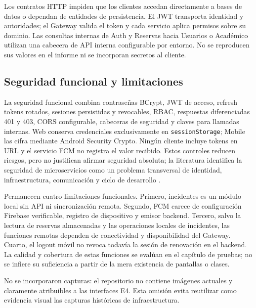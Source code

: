 Los contratos HTTP impiden que los clientes accedan directamente a bases de
datos o dependan de entidades de persistencia. El JWT transporta identidad y
autoridades; el Gateway valida el token y cada servicio aplica permisos sobre
su dominio. Las consultas internas de Auth y Reservas hacia Usuarios o
Académico utilizan una cabecera de API interna configurable por entorno. No se
reproducen sus valores en el informe ni se incorporan secretos al cliente.

\subsection{Seguridad funcional y limitaciones}
\label{subsec:seguridad-limitaciones-apps}

La seguridad funcional combina contraseñas BCrypt, JWT de acceso, refresh tokens
rotados, sesiones persistidas y revocables, RBAC, respuestas diferenciadas 401 y
403, CORS configurable, cabeceras de seguridad y claves para llamadas internas.
Web conserva credenciales exclusivamente en \texttt{sessionStorage}; Mobile las
cifra mediante Android Security Crypto. Ningún cliente incluye tokens en URL y
el servicio FCM no registra el valor recibido. Estos controles reducen riesgos,
pero no justifican afirmar seguridad absoluta; la literatura identifica la
seguridad de microservicios como un problema transversal de identidad,
infraestructura, comunicación y ciclo de desarrollo
\cite{berardi2022microservicesecurity}.

Permanecen cuatro limitaciones funcionales. Primero, incidentes es un módulo
local sin API ni sincronización remota. Segundo, FCM carece de configuración
Firebase verificable, registro de dispositivo y emisor backend. Tercero, salvo
la lectura de reservas almacenadas y las operaciones locales de incidentes, las
funciones remotas dependen de conectividad y disponibilidad del Gateway. Cuarto,
el logout móvil no revoca todavía la sesión de renovación en el backend. La
calidad y cobertura de estas funciones se evalúan en el capítulo de pruebas; no
se infiere su suficiencia a partir de la mera existencia de pantallas o clases.

No se incorporaron capturas: el repositorio no contiene imágenes actuales y
claramente atribuibles a las interfaces E4. Esta omisión evita reutilizar como
evidencia visual las capturas históricas de infraestructura.
